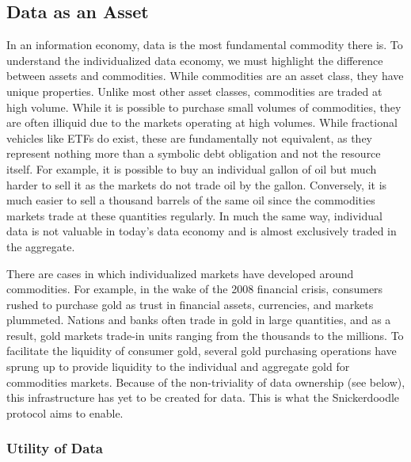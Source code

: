 \subsection{Data as an Asset}
In an information economy, data is the most fundamental commodity there is. To understand the individualized data economy, we must highlight the difference between assets 
and commodities. While commodities are an asset class, they have unique properties. Unlike most other asset classes, commodities are traded at high volume. While it is 
possible to purchase small volumes of commodities, they are often illiquid due to the markets operating at high volumes. While fractional vehicles like ETFs do exist, 
these are fundamentally not equivalent, as they represent nothing more than a symbolic debt obligation and not the resource itself. For example, it is possible to buy 
an individual gallon of oil but much harder to sell it as the markets do not trade oil by the gallon. Conversely, it is much easier to sell a thousand barrels of the 
same oil since the commodities markets trade at these quantities regularly. In much the same way, individual data is not valuable in today's data economy and is almost 
exclusively traded in the aggregate.

There are cases in which individualized markets have developed around commodities. For example, in the wake of the 2008 financial crisis, consumers rushed to purchase gold as trust in financial assets, currencies, and markets plummeted. Nations and banks often trade in gold in large quantities, and as a result, gold markets trade-in units ranging from the thousands to the millions. To facilitate the liquidity of consumer gold, several gold purchasing operations have sprung up to provide liquidity to the individual and aggregate gold for commodities markets. Because of the non-triviality of data ownership (see below), this infrastructure has yet to be created for data. This is what the Snickerdoodle protocol aims to enable.


\subsubsection{Utility of Data}


